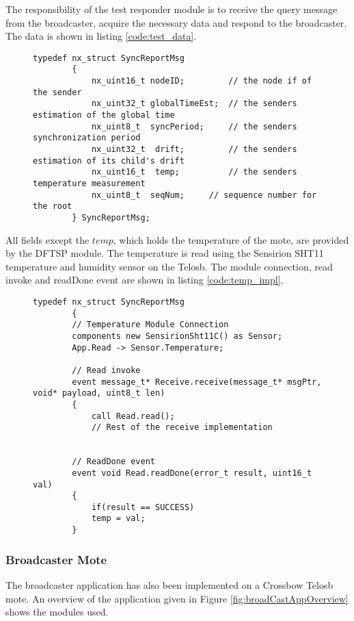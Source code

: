 \documentclass[Main]{subfiles}
\begin{document}
				The responsibility of the test responder module is to receive the query message from the broadcaster, acquire the necessary data and respond to the broadcaster.
				The data is shown in listing \ref{code:test_data}.

				\begin{figure}[H]
					\begin{lstlisting}[caption=DFTSP Test Data, style=Code-C, label=code:test_data]
		typedef nx_struct SyncReportMsg
		{
			nx_uint16_t	nodeID;			// the node if of the sender
			nx_uint32_t	globalTimeEst;	// the senders estimation of the global time
			nx_uint8_t  syncPeriod;		// the senders synchronization period
			nx_uint32_t  drift;			// the senders estimation of its child's drift
			nx_uint16_t  temp;			// the senders temperature measurement
			nx_uint8_t	seqNum;		// sequence number for the root
		} SyncReportMsg;

					\end{lstlisting}
				\end{figure}

				All fields except the $temp$, which holds the temperature of the mote, are provided by the DFTSP module.
				The temperature is read using the Sensirion SHT11\cite{tempSensorDatasheet} temperature and humidity sensor on the Telosb.
				The module connection, read invoke and readDone event are shown in listing \ref{code:temp_impl}.

				\begin{figure}[H]
					\begin{lstlisting}[caption=Temperature reading implementation, style=Code-C, label=code:temp_impl]
		typedef nx_struct SyncReportMsg
		{
		// Temperature Module Connection
		components new SensirionSht11C() as Sensor;
		App.Read -> Sensor.Temperature;

		// Read invoke
		event message_t* Receive.receive(message_t* msgPtr, void* payload, uint8_t len)
		{
	    	call Read.read();
	    	// Rest of the receive implementation


		// ReadDone event
		event void Read.readDone(error_t result, uint16_t val)
		{
			if(result == SUCCESS)
			temp = val;
		}

						\end{lstlisting}
				\end{figure}
		
		
		\subsubsection{Broadcaster Mote} %
		\label{sub:broadcaster_mote}
			The broadcaster application has also been implemented on a Crossbow Telosb mote. 
			An overview of the application given in Figure \ref{fig:broadCastAppOverview} shows the modules used. 
\end{document}
